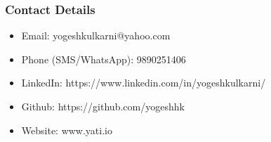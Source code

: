\begin{frame}[fragile]\frametitle{Contact Details}
\begin{itemize}
\item Email: yogeshkulkarni@yahoo.com
\item Phone (SMS/WhatsApp): 9890251406
\item LinkedIn: https://www.linkedin.com/in/yogeshkulkarni/
\item Github: https://github.com/yogeshhk
\item Website: www.yati.io
\end{itemize}
\end{frame}
